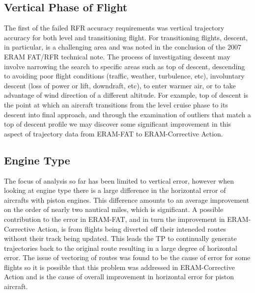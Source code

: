 \documentclass[]{article}
\begin{document}
\subsection{Vertical Phase of Flight}
\label{verticalPhase}
The first of the failed RFR accuracy requirements was vertical trajectory accuracy for both level and transitioning flight. For transitioning flights, descent, in particular, is a challenging area and was noted in the conclusion of the 2007 ERAM FAT/RFR technical note. The process of investigating descent may involve narrowing the search to specific areas such as top of descent, descending to avoiding poor flight conditions (traffic, weather, turbulence, etc), involuntary descent (loss of power or lift, downdraft, etc), to enter warmer air, or to take advantage of wind direction of a different altitude. For example, top of descent is the point at which an aircraft transitions from the level cruise phase to its descent into final approach, and through the examination of outliers that match a top of descent profile we may discover some significant improvement in this aspect of trajectory data from ERAM-FAT to ERAM-Corrective Action.

\subsection{Engine Type}
\label{engineType}
The focus of analysis so far has been limited to vertical error, however when looking at engine type there is a large difference in the horizontal error of aircrafts with piston engines. This difference amounts to an average improvement on the order of nearly two nautical miles, which is significant. A possible contribution to the error in ERAM-FAT, and in turn the improvement in ERAM-Corrective Action, is from flights being diverted off their inteneded routes without their track being updated. This leads the TP to continually generate trajectories back to the original route resulting in a large degree of horizontal error. The issue of vectoring of routes was found to be the cause of error for some flights so it is possible that this problem was addressed in ERAM-Corrective Action and is the cause of overall improvement in horizontal error for piston aircraft.
\end{document}
